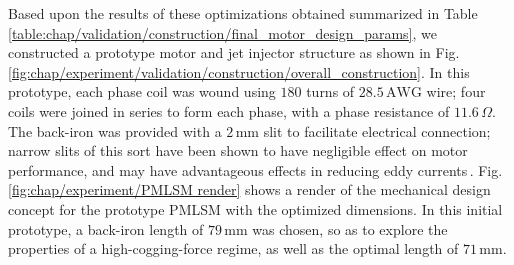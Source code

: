         
            Based upon the results of these optimizations obtained summarized in Table\,\ref{table:chap/validation/construction/final_motor_design_params}, we constructed a prototype motor and jet injector structure as shown in Fig.\,\ref{fig:chap/experiment/validation/construction/overall_construction}. In this prototype, each phase coil was wound using $180$ turns of $28.5\,\mathrm{AWG}$ wire; four coils were joined in series to form each phase, with a phase resistance of $11.6\,\Omega$. The back-iron was provided with a $2\,\mathrm{mm}$ slit to facilitate electrical connection; narrow slits of this sort have been shown to have negligible effect on motor performance, and may have advantageous effects in reducing eddy currents\,\cite{Meessen2009}. Fig.\,\ref{fig:chap/experiment/PMLSM render} shows a render of the mechanical design concept for the prototype \acs{PMLSM} with the optimized dimensions. In this initial prototype, a back-iron length of $79\,\mathrm{mm}$ was chosen, so as to explore the properties of a high-cogging-force regime, as well as the optimal length of $71\,\mathrm{mm}$.
        

